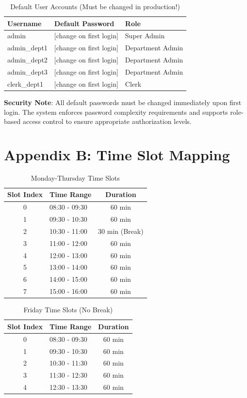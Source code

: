 \documentclass[12pt,a4paper]{article}
\begin{document}
\begin{table}[h]
\centering
\begin{tabular}{@{}lll@{}}
\toprule
\textbf{Username} & \textbf{Default Password} & \textbf{Role} \\ \midrule
admin & [change on first login] & Super Admin \\
admin\_dept1 & [change on first login] & Department Admin \\
admin\_dept2 & [change on first login] & Department Admin \\
admin\_dept3 & [change on first login] & Department Admin \\
clerk\_dept1 & [change on first login] & Clerk \\
\bottomrule
\end{tabular}
\caption{Default User Accounts (Must be changed in production!)}
\end{table}

\textbf{Security Note}: All default passwords must be changed immediately upon first login. The system enforces password complexity requirements and supports role-based access control to ensure appropriate authorization levels.

\section{Appendix B: Time Slot Mapping}

\begin{table}[h]
\centering
\begin{tabular}{@{}clc@{}}
\toprule
\textbf{Slot Index} & \textbf{Time Range} & \textbf{Duration} \\ \midrule
0 & 08:30 - 09:30 & 60 min \\
1 & 09:30 - 10:30 & 60 min \\
2 & 10:30 - 11:00 & 30 min (Break) \\
3 & 11:00 - 12:00 & 60 min \\
4 & 12:00 - 13:00 & 60 min \\
5 & 13:00 - 14:00 & 60 min \\
6 & 14:00 - 15:00 & 60 min \\
7 & 15:00 - 16:00 & 60 min \\
\bottomrule
\end{tabular}
\caption{Monday-Thursday Time Slots}
\end{table}

\begin{table}[h]
\centering
\begin{tabular}{@{}clc@{}}
\toprule
\textbf{Slot Index} & \textbf{Time Range} & \textbf{Duration} \\ \midrule
0 & 08:30 - 09:30 & 60 min \\
1 & 09:30 - 10:30 & 60 min \\
2 & 10:30 - 11:30 & 60 min \\
3 & 11:30 - 12:30 & 60 min \\
4 & 12:30 - 13:30 & 60 min \\
\bottomrule
\end{tabular}
\caption{Friday Time Slots (No Break)}
\end{table}
\end{document}
